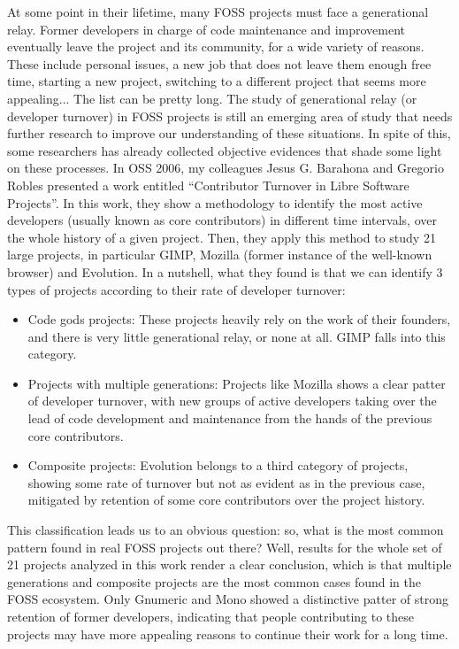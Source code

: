At some point in their lifetime, many FOSS projects must face a generational relay. Former developers in charge of code maintenance and improvement eventually leave the project and its community, for a wide variety of reasons. These include personal issues, a new job that does not leave them enough free time, starting a new project, switching to a different project that seems more appealing... The list can be pretty long.
The study of generational relay (or developer turnover) in FOSS projects is still an emerging area of study that needs further research to improve our understanding of these situations. In spite of this, some researchers has already collected objective evidences that shade some light on these processes. In OSS 2006, my colleagues Jesus G. Barahona and Gregorio Robles presented a work entitled ``Contributor Turnover in Libre Software Projects''. In this work, they show a methodology to identify the most active developers (usually known as core contributors) in different time intervals, over the whole history of a given  project. Then, they apply this method to study 21 large projects, in particular GIMP, Mozilla (former instance of the well-known browser) and Evolution. In a nutshell, what they found is that we can identify 3 types of projects according to their rate of developer turnover:
\begin{itemize}
 \item Code gods projects: These projects heavily rely on the work of their founders, and there is very little generational relay, or none at all. GIMP falls into this category.
 \item Projects with multiple generations: Projects like Mozilla shows a clear patter of developer turnover, with new groups of active developers taking over the lead of code development and maintenance from the hands of the previous core contributors.
 \item Composite projects: Evolution belongs to a third category of projects, showing some rate of turnover but not as evident as in the previous case, mitigated by retention of some core contributors over the project history.
\end{itemize}

This classification leads us to an obvious question: so, what is the most common pattern found in real FOSS projects out there? Well, results for the whole set of 21 projects analyzed in this work render a clear conclusion, which is that multiple generations and composite projects are the most common cases found in the FOSS ecosystem. Only Gnumeric and Mono showed a distinctive patter of strong retention of former developers, indicating that people contributing to these projects may have more appealing reasons to continue their work for a long time.

